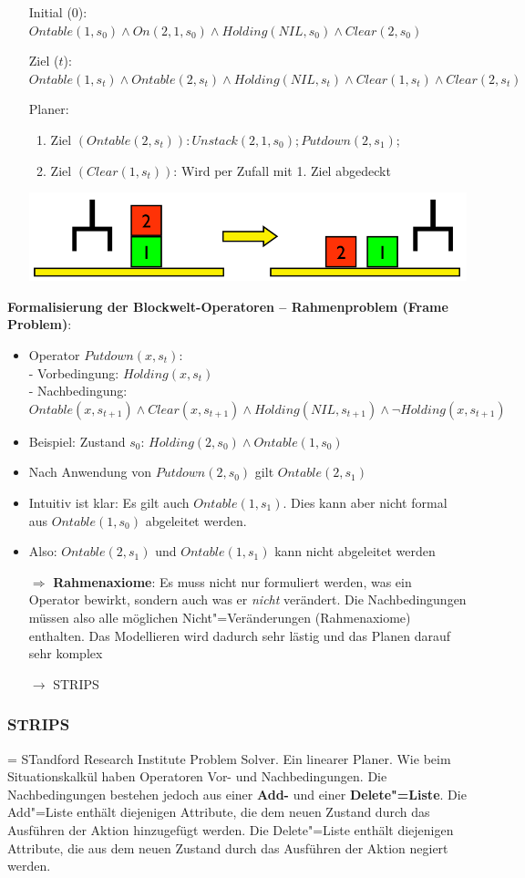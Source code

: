 \begin{itemize}
	\item[] Initial (0): $Ontable(1, s_0) \land On(2, 1, s_0) \land Holding(NIL, s_0) \land Clear(2, s_0)$
	\item[] Ziel ($t$): $Ontable(1, s_t) \land Ontable(2, s_t) \land Holding(NIL, s_t) \land Clear(1, s_t) \land Clear(2, s_t)$
	\item[] Planer:
	\begin{enumerate}
		\item Ziel $(Ontable(2,s_t)): Unstack(2, 1, s_0); Putdown(2, s_1);$
		\item Ziel $(Clear(1, s_t))$: Wird per Zufall mit 1. Ziel abgedeckt 
	\end{enumerate}
	\includegraphics[width=.5\textwidth]{figures/ch06_bw-bsp}
\end{itemize}
\textbf{Formalisierung der Blockwelt-Operatoren -- Rahmenproblem (Frame Problem)}:
\begin{itemize}
	\item Operator $Putdown(x, s_t)$:\\
		- Vorbedingung: $Holding(x, s_t)$\\
		- Nachbedingung: $Ontable(x, s_{t+1}) \land Clear (x, s_{t+1} ) \land Holding(NIL, s_{t+1} ) \land \lnot Holding(x, s_{t+1})$
	\item Beispiel: Zustand $s_0$: $Holding(2, s_0) \land Ontable(1, s_0)$
	\item Nach Anwendung von $Putdown(2, s_0)$ gilt $Ontable(2, s_1)$
	\item Intuitiv ist klar: Es gilt auch $Ontable(1, s_1)$. Dies kann aber nicht formal aus $Ontable(1, s_0)$ abgeleitet werden.
	\item Also: $Ontable(2, s_1)$ und $Ontable(1, s_1)$ kann nicht abgeleitet werden
	\item[$\Rightarrow$] \textbf{Rahmenaxiome}: Es muss nicht nur formuliert werden, was ein Operator bewirkt, sondern auch was er \textit{nicht} verändert. Die Nachbedingungen müssen also alle möglichen Nicht"=Veränderungen (Rahmenaxiome) enthalten. Das Modellieren wird dadurch sehr lästig und das Planen darauf sehr komplex 
	\item[$\rightarrow$] STRIPS
\end{itemize}
\subsubsection{STRIPS}
= STandford Research Institute Problem Solver.
Ein linearer Planer.
Wie beim Situationskalkül haben Operatoren Vor- und Nachbedingungen.
Die Nachbedingungen bestehen jedoch aus einer \textbf{Add-} und einer \textbf{Delete"=Liste}.
Die Add"=Liste enthält diejenigen Attribute, die dem neuen Zustand durch das Ausführen der Aktion hinzugefügt werden.
Die Delete"=Liste enthält diejenigen Attribute, die aus dem neuen Zustand durch das Ausführen der Aktion negiert werden.\\

